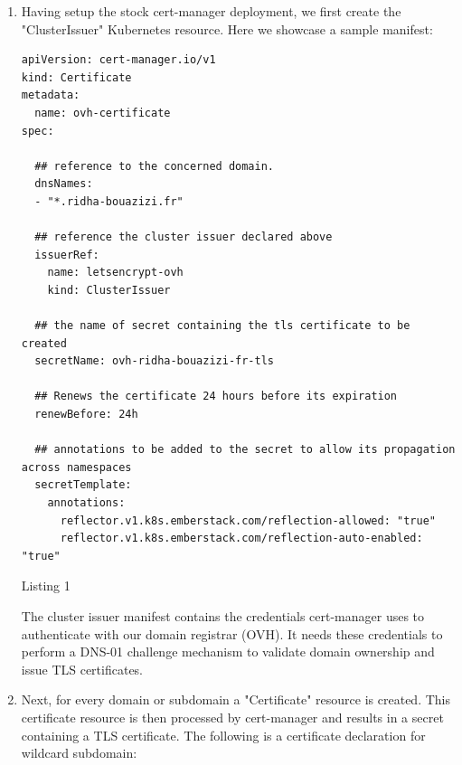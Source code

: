 \begin{enumerate}
    \item  Having setup the stock cert-manager deployment, we first create the "ClusterIssuer" Kubernetes resource. Here we showcase a sample manifest:

\begin{listing}[H]
\begin{verbatim}
apiVersion: cert-manager.io/v1
kind: Certificate
metadata:
  name: ovh-certificate
spec:
  
  ## reference to the concerned domain.
  dnsNames:
  - "*.ridha-bouazizi.fr"

  ## reference the cluster issuer declared above
  issuerRef:
    name: letsencrypt-ovh
    kind: ClusterIssuer

  ## the name of secret containing the tls certificate to be created
  secretName: ovh-ridha-bouazizi-fr-tls

  ## Renews the certificate 24 hours before its expiration
  renewBefore: 24h

  ## annotations to be added to the secret to allow its propagation across namespaces
  secretTemplate:
    annotations:
      reflector.v1.k8s.emberstack.com/reflection-allowed: "true"  
      reflector.v1.k8s.emberstack.com/reflection-auto-enabled: "true"
\end{verbatim}
\caption{Listing 1 }
\end{listing}

 
The cluster issuer manifest contains the credentials cert-manager uses to authenticate with our domain registrar (OVH). It needs these credentials to perform a DNS-01 challenge mechanism to validate domain ownership and issue TLS certificates.

 \item Next, for every domain or subdomain a "Certificate" resource is created. This certificate resource is then processed by cert-manager and results in a secret containing a TLS certificate. The following is a certificate declaration for wildcard subdomain:
 
 
\end{enumerate}

